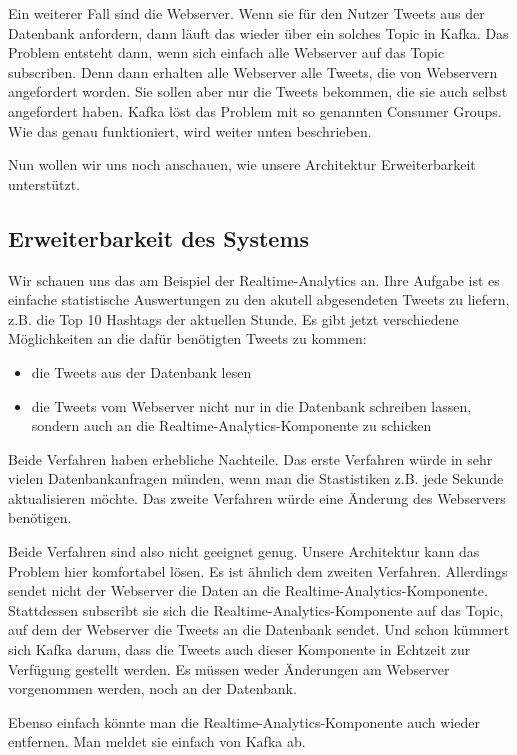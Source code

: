 Ein weiterer Fall sind die Webserver. Wenn sie für den Nutzer Tweets aus der Datenbank anfordern, dann läuft das wieder
über ein solches Topic in Kafka. Das Problem entsteht dann, wenn sich einfach alle Webserver auf das Topic subscriben.
Denn dann erhalten alle Webserver alle Tweets, die von Webservern angefordert worden. Sie sollen aber nur die
Tweets bekommen, die sie auch selbst angefordert haben. Kafka löst das Problem mit so genannten Consumer Groups.
Wie das genau funktioniert, wird weiter unten beschrieben.

Nun wollen wir uns noch anschauen, wie unsere Architektur Erweiterbarkeit unterstützt.

\subsection{Erweiterbarkeit des Systems}
Wir schauen uns das am Beispiel der Realtime-Analytics an. Ihre Aufgabe ist es einfache statistische Auswertungen zu den 
akutell abgesendeten Tweets zu liefern, z.B. die Top 10 Hashtags der aktuellen Stunde. Es gibt jetzt verschiedene Möglichkeiten
an die dafür benötigten Tweets zu kommen:
\begin{itemize}
  \item die Tweets aus der Datenbank lesen
  \item die Tweets vom Webserver nicht nur in die Datenbank schreiben lassen, sondern auch an die Realtime-Analytics-Komponente
zu schicken
\end{itemize}
Beide Verfahren haben erhebliche Nachteile. Das erste Verfahren würde in sehr vielen Datenbankanfragen münden, wenn man
die Stastistiken z.B. jede Sekunde aktualisieren möchte. Das zweite Verfahren würde eine Änderung des Webservers benötigen.

Beide Verfahren sind also nicht geeignet genug. Unsere Architektur kann das Problem hier komfortabel lösen. Es ist ähnlich dem
zweiten Verfahren. Allerdings sendet nicht der Webserver die Daten an die Realtime-Analytics-Komponente. Stattdessen
subscribt sie sich die Realtime-Analytics-Komponente auf das Topic, auf dem der Webserver die Tweets an die Datenbank
sendet. Und schon kümmert sich Kafka darum, dass die Tweets auch dieser Komponente in Echtzeit zur Verfügung gestellt werden.
Es müssen weder Änderungen am Webserver vorgenommen werden, noch an der Datenbank.

Ebenso einfach könnte man die Realtime-Analytics-Komponente auch wieder entfernen. Man meldet sie einfach von Kafka ab.

